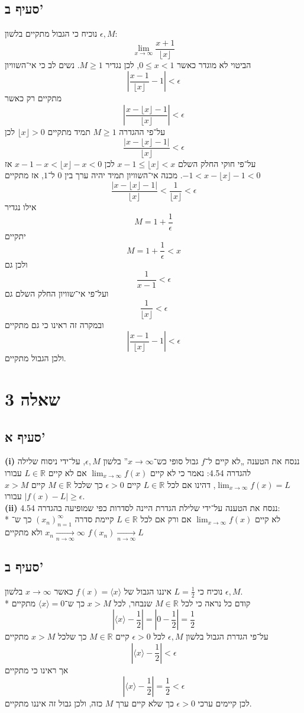 \documentclass[a4paper]{article}
\def\RR{\mathbb{R}}
\begin{document}
\subsection{סעיף ב'}
נוכיח כי הגבול מתקיים בלשון $\epsilon, M$:
\[
	\lim_{x \to \infty} \frac{x + 1}{\lfloor x \rfloor}
\]
הביטוי לא מוגדר כאשר $0 \le x < 1$, לכן נגדיר $M \ge 1$.
נשים לב כי אי־השוויון
\[
	\left| \frac{x-1}{\lfloor x \rfloor} - 1 \right| < \epsilon
\]
מתקיים רק כאשר
\[
	\left| \frac{x - \lfloor x \rfloor - 1}{\lfloor x \rfloor} \right|
	< \epsilon
\]
על־פי ההגדרה $M \ge 1$ תמיד מתקיים $\lfloor x \rfloor > 0$ לכן
\[
	\frac{\left| x - \lfloor x \rfloor - 1\right|}{\lfloor x \rfloor}
	< \epsilon
\]
על־פי חוקי החלק השלם
$x - 1 \le \lfloor x \rfloor < x$
לכן $x - 1 - x < \lfloor x \rfloor - x < 0$
אז $-1 < x - \lfloor x \rfloor - 1 < 0$.
מכנה אי־השוויון תמיד יהיה ערך בין $0$ ל־$1$, אז מתקיים
\[
	\frac{\left| x - \lfloor x \rfloor - 1\right|}{\lfloor x \rfloor}
	< \frac{1}{\lfloor x \rfloor} < \epsilon
\]
אילו נגדיר
\[
	M = 1 + \frac{1}{\epsilon}
\]
יתקיים
\[
	M = 1 + \frac{1}{\epsilon} < x
\]
ולכן גם
\[
	\frac{1}{x - 1} < \epsilon
\]
ועל־פי אי־שוויון החלק השלם גם
\[
	\frac{1}{\lfloor x \rfloor} < \epsilon
\]
ובמקרה זה ראינו כי גם מתקיים
\[
	\left| \frac{x-1}{\lfloor x \rfloor} - 1 \right| < \epsilon
\]
ולכן הגבול מתקיים.

\section{שאלה 3}
\subsection{סעיף א'}
\textbf{(i)}
ננסח את הטענה „לא קיים ל־$f$ גבול סופי כש־$x \to \infty$”
בלשון $\epsilon, M$, על־ידי ניסוח שלילה להגדרה 4.54:
נאמר כי לא קיים $\lim_{x \to \infty} f(x)$
אם לא קיים $L \in \RR$ עבורו $\lim_{x \to \infty} f(x) = L$,
דהינו אם לכל $L \in \RR$ קיים $\epsilon > 0$ כך שלכל $M \in \RR$
קיים $x > M$ עבורו $\left| f(x) - L\right| \ge \epsilon$. \\
\textbf{(ii)}
ננסח את הטענה על־ידי שלילת הגדרת היינה לסדרות כפי שמופיעה בהגדרה 4.54: \\*
לא קיים $\lim_{x \to \infty}f(x)$ אם ורק אם
לכל $L \in \RR$
קיימת סדרה ${(x_n)}_{n = 1}^\infty$
כך ש־$x_n \underset{n \to \infty}{\rightarrow} \infty$
ולא מתקיים $f(x_n) \underset{n \to \infty}{\rightarrow} L$

\subsection{סעיף ב'}
נוכיח כי $L = \frac{1}{2}$ איננו הגבול של $f(x) = \langle x \rangle$
כאשר $x \rightarrow \infty$ בלשון $\epsilon, M$. \\*
קודם כל נראה כי לכל $M \in \RR$ שנבחר, לכל $x > M$ כך ש־$\langle x \rangle = 0$ מתקיים
\[
	\left| \langle x \rangle - \frac{1}{2} \right| = \left| 0 - \frac{1}{2} \right| = \frac{1}{2}
\]
על־פי הגדרת הגבול בלשון $\epsilon, M$ לכל $\epsilon > 0$ קיים $M \in \RR$ כך שלכל $x > M$ מתקיים
\[
	\left| \langle x \rangle - \frac{1}{2} \right| < \epsilon
\]
אך ראינו כי מתקיים
\[
	\left| \langle x \rangle - \frac{1}{2} \right|  = \frac{1}{2} < \epsilon
\]
לכן קיימים ערכי $\epsilon > 0$ כך שלא קיים ערך $M$ כזה, ולכן גבול זה איננו מתקיים.
\end{document}
